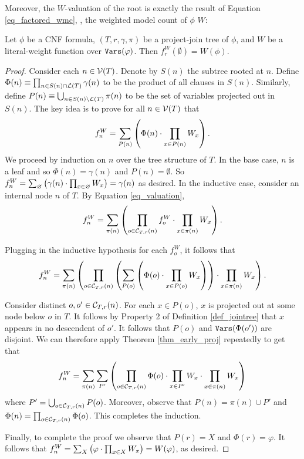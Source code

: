 Moreover, the $W$-valuation of the root is exactly the result of Equation \eqref{eq_factored_wmc}, \ie, the weighted model count of $\phi$ \wrt{} $W$:
\begin{theorem}
\label{thm_valuation_wmc}
    Let $\phi$ be a CNF formula, $(T, r, \gamma, \pi)$ be a project-join tree of $\phi$, and $W$ be a literal-weight function over $\texttt{\upshape Vars}(\varphi)$.
    Then $f^W_r(\emptyset) = W(\phi)$.
\end{theorem}
\begin{proof}
Consider each $n \in \mathcal{V}(T)$. Denote by $S(n)$ the subtree rooted at $n$.
Define $\Phi(n) \equiv \prod_{n \in S(n) \cap \mathcal{L}(T)} \gamma(n)$ to be the product of all clauses in $S(n)$. 
Similarly, define $P(n) \equiv \bigcup_{n \in S(n) \setminus \mathcal{L}(T)} \pi(n)$ to be the set of variables projected out in $S(n)$.
The key idea is to prove for all $n \in \mathcal{V}(T)$ that 
$$f^W_n = \sum_{P(n)} \left(  \Phi(n) \cdot \prod_{x \in P(n)} W_x  \right).$$
We proceed by induction on $n$ over the tree structure of $T$. In the base case, $n$ is a leaf and so $\Phi(n) = \gamma(n)$ and $P(n) = \emptyset$. So $f^W_n = \sum_{\varnothing} \left(  \gamma(n) \cdot \prod_{x \in \varnothing} W_x  \right) = \gamma(n)$ as desired. In the inductive case, consider an internal node $n$ of $T$. By Equation \ref{eq_valuation}, $$f^W_n = \sum_{\pi(n)} \left( \prod_{o \in \mathcal{C}_{T,r}(n)} f^W_o \cdot \prod_{x \in \pi(n)} W_x \right).$$

Plugging in the inductive hypothesis for each $f^W_o$, it follows that
$$f^W_n = \sum_{\pi(n)} \left( \prod_{o \in \mathcal{C}_{T,r}(n)} \left( \sum_{P(o)} \left(  \Phi(o) \cdot \prod_{x \in P(o)} W_{x}  \right)  \right) \cdot \prod_{x \in \pi(n)} W_{x} \right).$$

Consider distinct $o, o' \in \mathcal{C}_{T,r}(n)$. For each $x \in P(o)$, $x$ is projected out at some node below $o$ in $T$. It follows by Property 2 of Definition \ref{def_jointree} that $x$ appears in no descendent of $o'$. It follows that $P(o)$ and $\texttt{\upshape Vars}(\Phi(o'))$ are disjoint. We can therefore apply Theorem \ref{thm_early_proj} repeatedly to get that
$$f^W_n = \sum_{\pi(n)} \sum_{P'} \left(  \prod_{o \in \mathcal{C}_{T,r}(n)} \Phi(o) \cdot \prod_{x \in P'} W_{x} \cdot \prod_{x \in \pi(n)} W_{x}  \right)$$
where $P' = \bigcup_{o \in \mathcal{C}_{T,r}(n)} P(o)$. Moreover, observe that $P(n) = \pi(n) \cup P'$ and $\Phi(n) = \prod_{o \in \mathcal{C}_{T,r}(n)} \Phi(o)$. This completes the induction.

Finally, to complete the proof we observe that $P(r) = X$ and $\Phi(r) = \varphi$. It follows that $f^W_n = \sum_X \left(  \varphi \cdot \prod_{x \in X} W_x  \right) = W(\varphi)$, as desired.
\end{proof}

